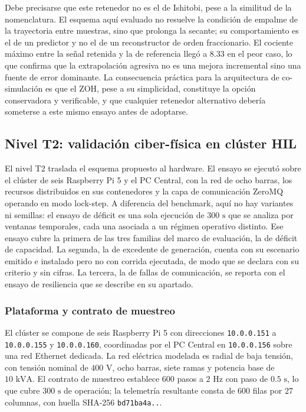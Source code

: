 Debe precisarse que este retenedor no es el de Ishitobi, pese a la similitud de la nomenclatura. El esquema aquí evaluado no resuelve la condición de empalme de la trayectoria entre muestras, sino que prolonga la secante; su comportamiento es el de un predictor y no el de un reconstructor de orden fraccionario. El cociente máximo entre la señal retenida y la de referencia llegó a $8.33$ en el peor caso, lo que confirma que la extrapolación agresiva no es una mejora incremental sino una fuente de error dominante. La consecuencia práctica para la arquitectura de co-simulación es que el ZOH, pese a su simplicidad, constituye la opción conservadora y verificable, y que cualquier retenedor alternativo debería someterse a este mismo ensayo antes de adoptarse.

\subsection{Nivel T2: validación ciber-física en clúster HIL}

El nivel T2 traslada el esquema propuesto al hardware. El ensayo se ejecutó sobre el clúster de seis Raspberry Pi 5 y el PC Central, con la red de ocho barras, los recursos distribuidos en sus contenedores y la capa de comunicación ZeroMQ operando en modo lock-step. A diferencia del benchmark, aquí no hay variantes ni semillas: el ensayo de déficit es una sola ejecución de $300\text{ s}$ que se analiza por ventanas temporales, cada una asociada a un régimen operativo distinto. Ese ensayo cubre la primera de las tres familias del marco de evaluación, la de déficit de capacidad. La segunda, la de excedente de generación, cuenta con su escenario emitido e instalado pero no con corrida ejecutada, de modo que se declara con su criterio y sin cifras. La tercera, la de fallas de comunicación, se reporta con el ensayo de resiliencia que se describe en su apartado.

\subsubsection{Plataforma y contrato de muestreo}

El clúster se compone de seis Raspberry Pi 5 con direcciones \texttt{10.0.0.151} a \texttt{10.0.0.155} y \texttt{10.0.0.160}, coordinadas por el PC Central en \texttt{10.0.0.156} sobre una red Ethernet dedicada. La red eléctrica modelada es radial de baja tensión, con tensión nominal de $400\text{ V}$, ocho barras, siete ramas y potencia base de $10\text{ kVA}$. El contrato de muestreo establece $600$ pasos a $2\text{ Hz}$ con paso de $0.5\text{ s}$, lo que cubre $300\text{ s}$ de operación; la telemetría resultante consta de $600$ filas por $27$ columnas, con huella SHA-256 \texttt{bd71ba4a..}.

